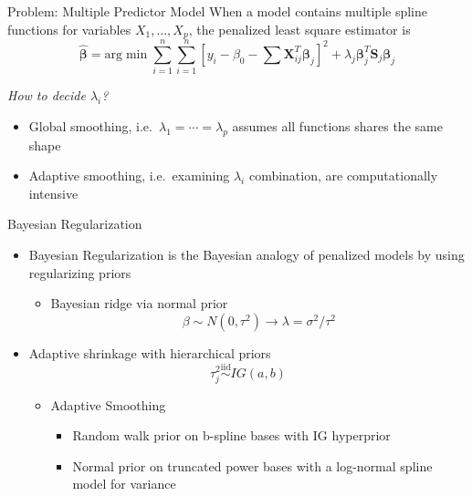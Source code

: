 \documentclass[
  ignorenonframetext,
  aspectratio=169]{beamer}
\providecommand{\tightlist}{%
  \setlength{\itemsep}{0pt}\setlength{\parskip}{0pt}}
\newcommand{\bs}[1]{\boldsymbol{#1}}
\newcommand{\simiid}{\overset{\text{iid}}{\sim}}
\begin{document}
\begin{frame}{Problem: Multiple Predictor Model}
\protect\hypertarget{problem-multiple-predictor-model}{}
When a model contains multiple spline functions for variables
\(X_1, \dots, X_p\), the penalized least square estimator is \[
\boldsymbol{\hat \beta} = \text{arg}\min \sum\limits^n_{i=1} \sum\limits^n_{i=1} \left[y_i - \beta_0 - \sum\limits \bs X_{ij}^T \bs \beta_j \right]^2 + \lambda_j \bs \beta_j^T \bs S_j \bs\beta_j
\]

\emph{How to decide \(\lambda_i\)?}

\begin{itemize}
\tightlist
\item
  Global smoothing, i.e.~\(\lambda_1 = \cdots =\lambda_p\) assumes all
  functions shares the same shape
\item
  Adaptive smoothing, i.e.~examining \(\lambda_i\) combination, are
  computationally intensive
\end{itemize}
\end{frame}

\begin{frame}{Bayesian Regularization}
\protect\hypertarget{bayesian-regularization-1}{}
\begin{itemize}
\tightlist
\item
  Bayesian Regularization is the Bayesian analogy of penalized models by
  using regularizing priors

  \begin{itemize}
  \tightlist
  \item
    Bayesian ridge via normal prior \[
     \beta \sim N(0, \tau^2) \rightarrow  \lambda = \sigma^2/\tau^2
    \]
  \end{itemize}
\item
  Adaptive shrinkage with hierarchical priors \[
   \tau^2_j \simiid IG(a, b)
  \]

  \begin{itemize}
  \tightlist
  \item
    Adaptive Smoothing

    \begin{itemize}
    \tightlist
    \item
      Random walk prior on b-spline bases with IG hyperprior
    \item
      Normal prior on truncated power bases with a log-normal spline
      model for variance
    \end{itemize}
  \end{itemize}
\end{itemize}
\end{frame}
\end{document}
